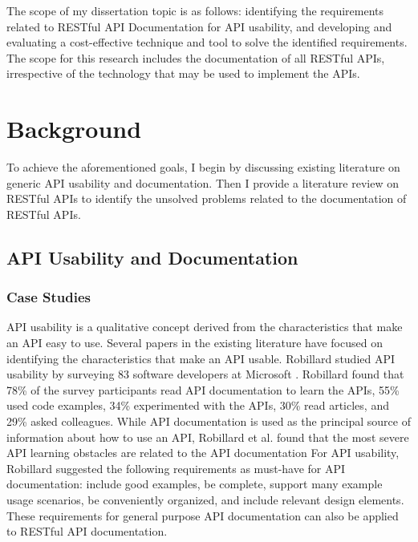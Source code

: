 \documentclass[11pt,oneside]{book}
\begin{document}
The scope of my dissertation topic is as follows: identifying the requirements related to RESTful API Documentation for API usability, and developing and evaluating a cost-effective technique and tool to solve the identified requirements. The scope for this research includes the documentation of all RESTful APIs, irrespective of the technology that may be used to implement the APIs.

\chapter{Background}

To achieve the aforementioned goals, I begin by discussing existing literature on generic API usability and documentation. Then I provide a literature review on RESTful APIs to identify the unsolved problems related to the documentation of RESTful APIs.


\section{API Usability and Documentation}

\subsection{Case Studies} %
\label{ssub:case_studies}


API usability is a qualitative concept derived from the characteristics that make an API easy to use. Several papers in the existing literature have focused on identifying the characteristics that make an API usable. Robillard studied API usability by surveying 83 software developers at Microsoft \cite{Robillard_a_field_study}. Robillard found that 78\% of the survey participants read API documentation to learn the APIs, 55\% used code examples, 34\% experimented with the APIs, 30\% read articles, and 29\% asked colleagues. While API documentation is used as the principal source of information about how to use an API, Robillard et al. found that the most severe API learning obstacles are related to the API documentation For API usability, Robillard suggested the following requirements as must-have for API documentation: include good examples, be complete, support many example usage scenarios, be conveniently organized, and include relevant design elements. These requirements for general purpose API documentation can also be applied to RESTful API documentation.
\end{document}

